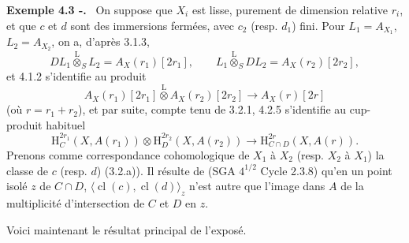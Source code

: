\documentclass[11pt]{article}
\newenvironment{statement}[1]{\par\medskip\noindent\textbf{#1.}\ }{\par\medskip}
\renewcommand{\H}{\mathrm{H}}
\providecommand{\cl}{\operatorname{cl}}
\providecommand{\cl}{\operatorname{cl}}
\providecommand{\cl}{\operatorname{cl}}
\begin{document}
\begin{statement}{Exemple 4.3 -}
On suppose que $X_i$ est lisse, purement de dimension relative $r_i$, et que $c$ et $d$ sont des immersions fermées, avec $c_2$ (resp. $d_1$) fini. Pour $L_1=A_{X_1}$, $L_2=A_{X_2}$, on a, d'après 3.1.3,
\[
DL_1\overset{\mathrm{L}}{\otimes}_SL_2=A_X(r_1)[2r_1],\qquad
L_1\overset{\mathrm{L}}{\otimes}_SDL_2=A_X(r_2)[2r_2],
\]
et 4.1.2 s'identifie au produit
\[
A_X(r_1)[2r_1]\overset{\mathrm{L}}{\otimes}A_X(r_2)[2r_2]\longrightarrow A_X(r)[2r]
\]
(où $r=r_1+r_2$), et par suite, compte tenu de 3.2.1, 4.2.5 s'identifie au cup-produit habituel
\[
\H_C^{2r_1}(X,A(r_1))\otimes \H_D^{2r_2}(X,A(r_2))
\longrightarrow
\H_{C\cap D}^{2r}(X,A(r)).
\]
Prenons comme correspondance cohomologique de $X_1$ à $X_2$ (resp. $X_2$ à $X_1$) la classe de $c$ (resp. $d$) (3.2.a)). Il résulte de (SGA $4^{1/2}$ Cycle 2.3.8) qu'en un point isolé 
$z$ de $C\cap D$, $\langle \cl(c),\cl(d)\rangle_z$ n'est
autre que l'image dans $A$ de la multiplicité d'intersection de $C$ et $D$ en $z$.
\end{statement}

Voici maintenant le résultat principal de l'exposé.
\end{document}
